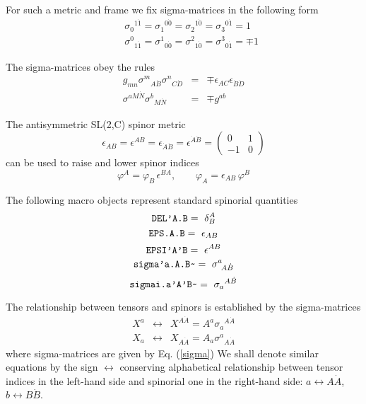 \documentclass[twoside,openright]{report}
\newcommand{\grgtt}{\ttfamily}
\newcommand{\object}[2]{%
\begin{equation}
\mbox{\comm{#1}} =\ #2
\end{equation}}
\newcommand{\tsst}{\longleftrightarrow}
\renewcommand{\tt}{\grgtt}
\newcommand{\cc}{{\tt \char'176}}           %
\newcommand{\comm}[1]{{\upshape\tt#1}}    %
\begin{document}
For such a metric and frame we fix sigma-matrices in the
following form 
\begin{eqnarray}  \label{sigma}
&&\sigma_0{}^{1\dot{1}}=
\sigma_1{}^{0\dot{0}}=
\sigma_2{}^{1\dot{0}}=
\sigma_3{}^{0\dot{1}}=1 \\[1mm] &&
\sigma^0{}_{1\dot{1}}=
\sigma^1{}_{0\dot{0}}=
\sigma^2{}_{1\dot{0}}=
\sigma^3{}_{0\dot{1}}=\mp1
\end{eqnarray}

The sigma-matrices obey the rules
\begin{eqnarray}
g_{mn}\sigma^m\!{}_{A\dot B}\sigma^n\!{}_{C\dot D} &=&
\mp \epsilon_{AC}\epsilon_{\dot B\dot D} \\[1mm]
\sigma^{aM\dot N}\sigma^b\!{}_{M\dot N} &=& \mp g^{ab}
\end{eqnarray}

The antisymmetric SL(2,C) spinor metric
\begin{equation}
\epsilon_{AB}=\epsilon^{AB}
=\epsilon_{\dot A\dot B}
=\epsilon^{\dot A\dot B}=
\left(\begin{array}{rr}
0 & 1 \\
-1 & 0
\end{array}\right)
\end{equation}
can be used to raise and lower spinor indices
\begin{equation}
\varphi^A=\varphi_B\,\epsilon^{BA},\qquad
\varphi_A=\epsilon_{AB}\,\varphi^B
\end{equation}

The following macro objects represent standard
spinorial quantities
\object{DEL'A.B}{\delta^A_B}
\object{EPS.A.B}{\epsilon_{AB}}
\object{EPSI'A'B}{\epsilon^{AB}}
\object{sigma'a.A.B\cc}{\sigma^a\!{}_{A\dot B}}
\object{sigmai.a'A'B\cc}{\sigma_a{}^{A\dot B}}

The relationship between tensors and spinors
is established by the sigma-matrices
\begin{eqnarray}
X^a &\tsst& X^{A\dot A}=A^a\sigma_a{}^{A\dot A} \\
X_a &\tsst& X_{A\dot A}=A_a\sigma^a\!{}_{A\dot A}
\end{eqnarray}
where sigma-matrices are given by Eq. (\ref{sigma})
We shall denote similar equations by the sign $\tsst$
conserving alphabetical relationship between tensor indices in the
left-hand side and spinorial one in the right-hand side:
$\scriptstyle a\tsst A\dot A$, $\scriptstyle b\tsst B\dot B$.
\end{document}
